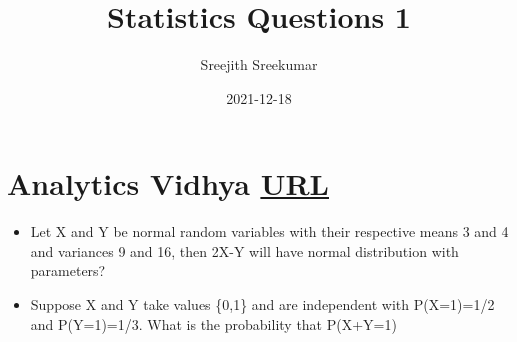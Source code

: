\documentclass[11pt]{article}
\author{Sreejith Sreekumar}
\date{2021-12-18}
\title{Statistics Questions 1}
\begin{document}
\maketitle
\tableofcontents



\section{Analytics Vidhya \href{https://www.analyticsvidhya.com/blog/2021/04/25-probability-and-statistics-questions-to-ace-your-data-science-interviews/\#h2\_3}{\underline{URL}}}
\label{sec:org2ad0b72}

\begin{itemize}
\item Let X and Y be normal random variables with their respective means 3 and 4 and variances 9 and 16, then 2X-Y will have normal distribution with parameters?
\item Suppose X and Y take values \{0,1\} and are independent with P(X=1)=1/2 and P(Y=1)=1/3. What is the probability that P(X+Y=1)
\end{itemize}

\section{}
\label{sec:orgaedd722}
\end{document}
